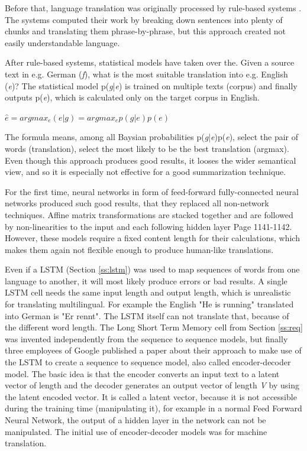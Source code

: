 Before that, language translation was originally processed by rule-based systems \cite{chen-goodman}. The systems computed their work by breaking down sentences into plenty of chunks and translating them phrase-by-phrase, but this approach created not easily understandable language.

After rule-based systems, statistical models have taken over the. Given a source text in e.g. German (\textit{f}), what is the most suitable translation into e.g. English (\textit{e})? The statistical model p(\textit{g}|\textit{e}) is trained on multiple texts (corpus) and finally outputs p(\textit{e}), which is calculated only on the target corpus in English. 

\begin{center}
\begin{math}
\hat{e} = argmax_{e}(e|g) = argmax_{e} p(g|e) p(e)
\label{eq:rule}
\end{math}
\end{center}

The formula means, among all Baysian probabilities p(\textit{g}|\textit{e})p(\textit{e}), select the pair of words (translation), select the most likely to be the best translation (argmax). Even though this approach produces good results, it looses the wider semantical view, and so it is especially not effective for a good summarization technique.

For the first time, neural networks in form of feed-forward fully-connected neural networks produced such good results, that they replaced all non-network techniques. Affine matrix transformations are stacked together and are followed by non-linearities to the input and each following hidden layer \cite{Bengio} Page 1141-1142. However, these models require a fixed content length for their calculations, which makes them again not flexible enough to produce human-like translations. 

Even if a LSTM (Section \ref{ss:lstm}) was used to map sequences of words from one language to another, it will most likely produce errors or bad results. A single LSTM cell needs the same input length and output length, which is unrealistic for translating multilingual. For example the English "He is running" translated into German is "Er rennt". The LSTM itself can not translate that, because of the different word length. 
The Long Short Term Memory cell from Section \ref{ss:req} was invented independently from the sequence to sequence models, but
finally three employees of Google published a paper about their approach to make use of the LSTM to create a sequence to sequence model, also called encoder-decoder model.
The basic idea is that the encoder converts an input text to a latent vector of length  and the decoder generates an output vector of length \textit{V} by using the latent encoded vector. It is called a latent vector, because it is not accessible during the training time (manipulating it), for example in a normal Feed Forward Neural Network, the output of a hidden layer in the network can not be manipulated. The initial use of encoder-decoder models was for machine translation.

